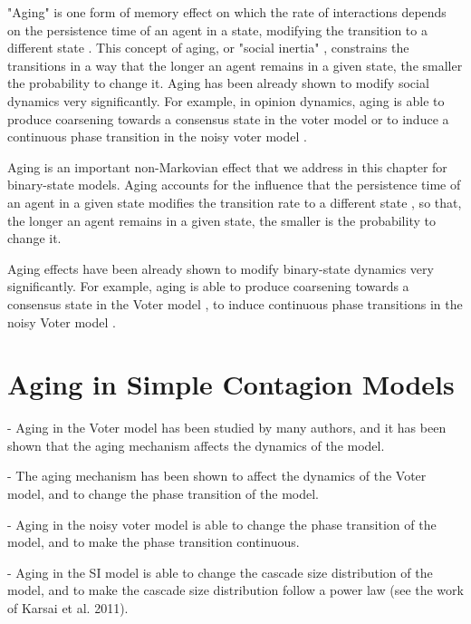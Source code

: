 "Aging" is one form of memory effect on which the rate of interactions depends on the persistence time of an agent in a state, modifying the transition to a different state \cite{fernandez-gracia-2011,perez-2016,boguna-2014}. This concept of aging, or "social inertia" \cite{Stark2008}, constrains the transitions in a way that the longer an agent remains in a given state, the smaller the probability to change it. Aging has been already shown to modify social dynamics very significantly. For example, in opinion dynamics, aging is able to produce coarsening towards a consensus state in the voter model \cite{fernandez-gracia-2011,peralta-2020} or to induce a continuous phase transition in the noisy voter model \cite{artime-2018}.

Aging is an important non-Markovian effect that we address in this chapter for binary-state models. Aging accounts for the influence that the persistence time of an agent in a given state modifies the transition rate to a different state \cite{stark-2008,fernandez-gracia-2011,perez-2016,boguna-2014,chen-2020}, so that, the longer an agent remains in a given state, the smaller is the probability to change it. 

Aging effects have been already shown to modify binary-state dynamics very significantly. For example, aging is able to produce coarsening towards a consensus state in the Voter model \cite{fernandez-gracia-2011,peralta-2020C}, to induce continuous phase transitions in the noisy Voter model \cite{artime-2018,peralta-2020A}.

\section{\label{sec:Aging in Simple Contagion Models} Aging in Simple Contagion Models}

- Aging in the Voter model has been studied by many authors, and it has been shown that the aging mechanism affects the dynamics of the model.

- The aging mechanism has been shown to affect the dynamics of the Voter model, and to change the phase transition of the model.

- Aging in the noisy voter model is able to change the phase transition of the model, and to make the phase transition continuous.

- Aging in the SI model is able to change the cascade size distribution of the model, and to make the cascade size distribution follow a power law (see the work of Karsai et al. 2011).